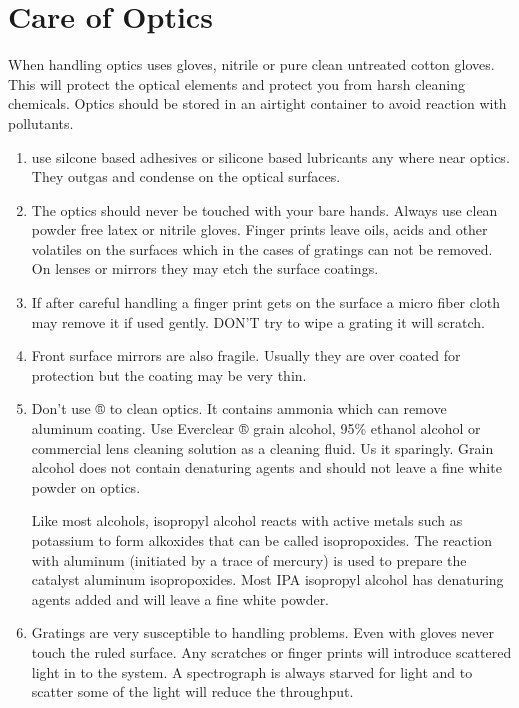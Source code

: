 \documentclass[letterpaper,10pt,english,openany,oneside]{sphinxmanual}
\begin{document}
\chapter{Care of Optics}
\label{\detokenize{optics:care-of-optics}}\label{\detokenize{optics::doc}}
\sphinxAtStartPar
When handling optics uses gloves, nitrile or pure clean untreated
cotton gloves. This will protect the optical elements and protect
you from harsh cleaning chemicals. Optics should be stored in an
airtight container to avoid reaction with pollutants.
\begin{enumerate}
%
\item {} 
\sphinxAtStartPar
{} use silcone based adhesives or silicone based lubricants any
where near optics. They outgas and condense on the optical surfaces.

\item {} 
\sphinxAtStartPar
The optics should never be touched with your bare hands.  Always
use clean powder free latex or nitrile gloves. Finger prints leave
oils, acids and other volatiles on the surfaces which in the cases of
gratings can not be removed. On lenses or mirrors they may etch the
surface coatings.

\item {} 
\sphinxAtStartPar
If after careful handling a finger print gets on the surface a
micro fiber cloth may remove it if used gently.  DON’T try to wipe a
grating it will scratch.

\item {} 
\sphinxAtStartPar
Front surface mirrors are also fragile. Usually they are over
coated for protection but the coating may be very thin.

\item {} 
\sphinxAtStartPar
Don’t use  ® to clean optics. It contains ammonia which
can remove aluminum coating. Use Everclear ® grain alcohol, 95\%
ethanol alcohol or commercial lens cleaning solution as a cleaning
fluid. Us it sparingly. Grain alcohol does not contain denaturing
agents and should not leave a fine white powder on optics.

\sphinxAtStartPar
Like most alcohols, isopropyl alcohol reacts with active metals
such as potassium to form alkoxides that can be called
isopropoxides. The reaction with aluminum (initiated by a trace
of mercury) is used to prepare the catalyst aluminum
isopropoxides. Most IPA isopropyl alcohol has denaturing
agents added and will leave a fine white powder.

\item {} 
\sphinxAtStartPar
Gratings are very susceptible to handling problems. Even with
gloves never touch the ruled surface.  Any scratches or finger prints
will introduce scattered light in to the system. A spectrograph is
always starved for light and to scatter some of the light will reduce
the throughput.

\end{enumerate}
\end{document}
